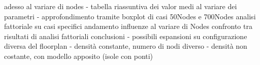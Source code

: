 adesso al variare di nodes
- tabella riassuntiva dei valor medi al variare dei parametri
- approfondimento tramite boxplot di casi 50Nodes e 700Nodes
analisi fattoriale su casi specifici
	andamento influenze al variare di Nodes
confronto tra risultati di analisi fattoriali
conclusioni
- possibili espansioni su configurazione diversa del floorplan
    - densità constante, numero di nodi diverso
    - densità non costante, con modello apposito (isole con ponti)
\fi
